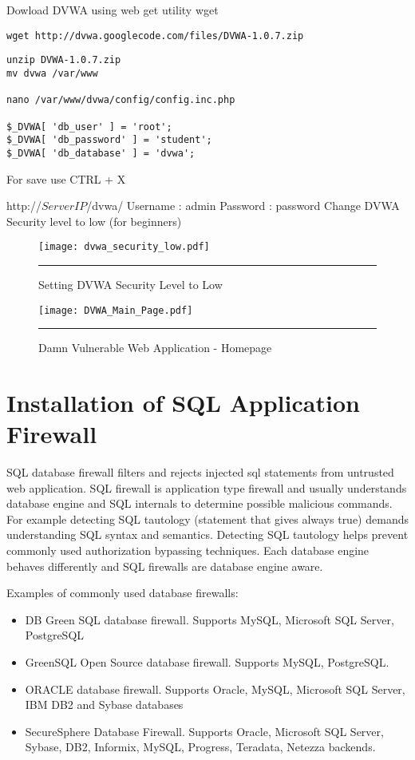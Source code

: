 Dowload DVWA using web get utility wget
\begin{verbatim}
wget http://dvwa.googlecode.com/files/DVWA-1.0.7.zip
\end{verbatim}

\begin{verbatim}
unzip DVWA-1.0.7.zip
mv dvwa /var/www

nano /var/www/dvwa/config/config.inc.php

$_DVWA[ 'db_user' ] = 'root';
$_DVWA[ 'db_password' ] = 'student';
$_DVWA[ 'db_database' ] = 'dvwa';
\end{verbatim}
For save use  CTRL + X


http://$ServerIP$/dvwa/
Username : admin
Password : password
Change DVWA Security level to low (for beginners)

\begin{figure}[H] 
 \centering 
 \texttt{[image: dvwa\_security\_low.pdf]}
 \rule{25em}{0.5pt}  
 \caption{Setting DVWA Security Level to Low} 
 \label{Setting DVWA Security Level to Low} 
\end{figure}


\begin{figure}[H] 
 \centering 
 \texttt{[image: DVWA\_Main\_Page.pdf]}
 \rule{30em}{0.5pt}  
 \caption{Damn Vulnerable Web Application - Homepage} 
 \label{Damn Vulnerable Web Application - Homepage} 
\end{figure}


\section{Installation of SQL Application Firewall}
SQL database firewall filters and rejects injected sql statements from untrusted web application. SQL firewall is application type firewall and usually understands database engine and SQL internals to determine possible malicious commands. For example detecting  SQL tautology (statement that gives always true) demands understanding SQL syntax and semantics. Detecting SQL tautology helps prevent commonly used authorization bypassing techniques.
Each database engine behaves differently and SQL firewalls are database engine aware.


Examples of commonly used database firewalls:
\begin{itemize}
\item DB Green SQL database firewall. Supports MySQL, Microsoft SQL Server, PostgreSQL
\item GreenSQL Open Source database firewall. Supports MySQL, PostgreSQL.
\item ORACLE database firewall. Supports Oracle, MySQL, Microsoft SQL Server, IBM DB2 and Sybase databases
\item SecureSphere Database Firewall. Supports Oracle, Microsoft SQL Server, Sybase, DB2, Informix, MySQL, Progress, Teradata, Netezza backends.
\end{itemize}

